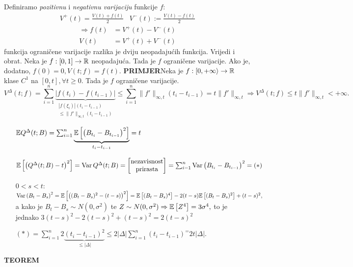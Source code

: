 \documentclass{article}
\newcommand{\Var}{\operatorname{Var}}
\begin{document}
Definiramo \emph{pozitivnu} i \emph{negativnu varijaciju} funkcije \(f\): \[\begin{matrix}V^+(t)=\frac{V(t)+f(t)}2&V^-(t):=\frac{V(t)-f(t)}2\end{matrix}\] \[\begin{aligned}\Rightarrow f(t)&=V^+(t)-V^-(t)\\V(t)&=V^+(t)+V^-(t)\end{aligned}\] funkcija ograničene varijacije razlika je dviju neopadajućih funkcija. Vrijedi i obrat.\newline\newline
Neka je \(f:[0,1]\to\Bbb R\) neopadajuća. Tada je \(f\) ograničene varijacije. Ako je, dodatno, \(f(0)=0, V(t;f)=f(t).\)\newline\newline
\textbf{PRIMJER}\newline Neka je \(f:[0,+\infty\rangle\to\Bbb R\) klase \(C^1\) na \([0,t],\forall t\ge0.\) Tada je \(f\) ograničene varijacije. \[V^\Delta(t;f)=\sum_{i=1}^n\underbrace{|f(t_i)-f(t_{i-1})|}_{\substack{|f(\xi_i)|(t_i-t_{i-1})\\\le\|f'\|_{\infty,t}(t_i-t_{i-1})}}\le\sum_{i=1}^n\|f'\|_{\infty,t}(t_i-t_{i-1})=t\|f'\|_{\infty,t}\Rightarrow V^\Delta(t;f)\le t\|f'\|_{\infty,t}<+\infty.\]
\begin{enumerate}
    \item[] \(\Bbb E Q^\Delta(t;B)=\sum_{i=1}^n\underbrace{\Bbb E\left[\left(B_{t_i}-B_{t_{i-1}}\right)^2\right]}_{t_i-t_{i-1}}=t\) 
    \item[] \(\Bbb E\left[\left(Q^\Delta(t;B)-t\right)^2\right]=\Var Q^\Delta(t;B)=\begin{bmatrix}\text{nezavisnost}\\\text{prirasta}\end{bmatrix}=\sum_{i=1}^n\Var\left(B_{t_i}-B_{t_{i-1}}\right)^2=(\ast)\)
    \item[\(0<s<t\):] \(\Var\left(B_t-B_s\right)^2=\Bbb E\left[\left((B_t-B_s)^2-(t-s)\right)^2\right]=\Bbb E\left[(B_t-B_s)^4\right]-2(t-s)\Bbb E\left[(B_t-B_s)^2\right]+(t-s)^2,\) a kako je \(B_t-B_s\sim N(0,\sigma^2)\) te \(Z\sim N(0,\sigma^2)\Rightarrow\Bbb E\left[Z^4\right]=3\sigma^4,\) to je jednako \(3(t-s)^2-2(t-s)^2+(t-s)^2=2(t-s)^2\)
    \item[] \((\ast)=\sum_{i=1}^n2\underbrace{\left(t_i-t_{i-1}\right)^2}_{\le|\Delta|}\le2|\Delta|\sum_{i=1}^n(t_i-t_{i-1})^=2t|\Delta|.\)
\end{enumerate}
\textbf{TEOREM}\newline
\end{document}
